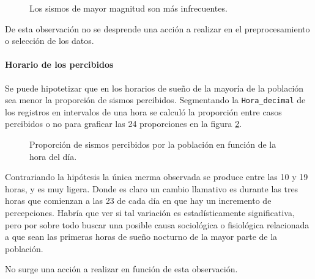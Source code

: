 \documentclass[a4paper]{report}
\begin{document}

\begin{figure}[!ht]
\centering

\caption{Los sismos de mayor magnitud son más infrecuentes.}
\label{fig:acumulado_anual_magnitud}
\end{figure}

De esta observación no se desprende una acción a realizar en el preprocesamiento o selección de los datos.


\paragraph{Horario de los percibidos}
Se puede hipotetizar que en los horarios de sueño de la mayoría de la población sea menor la proporción de sismos percibidos.
Segmentando la \verb'Hora_decimal' de los registros en intervalos de una hora se calculó la proporción entre casos percibidos o no para graficar las 24 proporciones en la figura \ref{fig:histograma_percibidos_por_hora}. 
\begin{figure}[!ht]
\centering

\caption{Proporción de sismos percibidos por la población en función de la hora del día.}
\label{fig:histograma_percibidos_por_hora}
\end{figure}

Contrariando la hipótesis la única merma observada se produce entre las 10 y 19 horas, y es muy ligera.
Donde es claro un cambio llamativo es durante las tres horas que comienzan a las 23 de cada día en que hay un incremento de percepciones. 
Habría que ver si tal variación es estadísticamente significativa, pero por sobre todo buscar una posible causa sociológica o fisiológica relacionada a que sean las primeras horas de sueño nocturno de la mayor parte de la población.

No surge una acción a realizar en función de esta observación.
\end{document}
